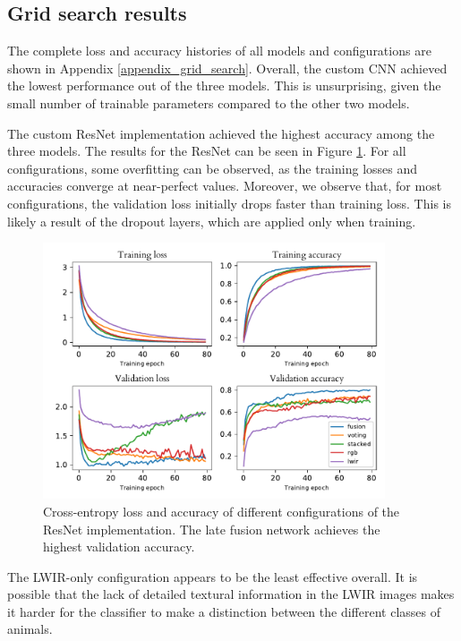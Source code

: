 \documentclass{l4proj}
\begin{document}
\subsection{Grid search results}

The complete loss and accuracy histories of all models and configurations are shown in Appendix \ref{appendix_grid_search}. Overall, the custom CNN achieved the lowest performance out of the three models. This is unsurprising, given the small number of trainable parameters compared to the other two models.

The custom ResNet implementation achieved the highest accuracy among the three models. The results for the ResNet can be seen in Figure \ref{fig:resnet_configs}. For all configurations, some overfitting can be observed, as the training losses and accuracies converge at near-perfect values. Moreover, we observe that, for most configurations, the validation loss initially drops faster than training loss. This is likely a result of the dropout layers, which are applied only when training.

\begin{figure}[ht]
  \centering
  \includegraphics[width=0.9\textwidth]{images/evaluation/gridsearch/ResNet}
  \caption{Cross-entropy loss and accuracy of different configurations of the ResNet implementation. The late fusion network achieves the highest validation accuracy.}
  \label{fig:resnet_configs}
\end{figure}

The LWIR-only configuration appears to be the least effective overall. It is possible that the lack of detailed textural information in the LWIR images makes it harder for the classifier to make a distinction between the different classes of animals.
\end{document}
